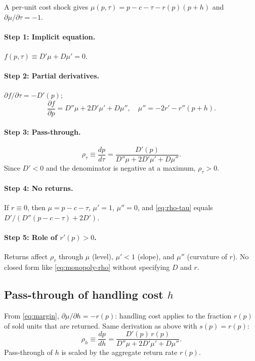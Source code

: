 \documentclass[11pt]{article}
\begin{document}
A per-unit cost shock gives $\mu(p,\tau) = p - c - \tau - r(p)(p+h)$ and
$\partial\mu/\partial\tau = -1$.

\paragraph{Step 1: Implicit equation.}
$f(p,\tau) \equiv D'\mu + D\mu' = 0$.

\paragraph{Step 2: Partial derivatives.}
$\partial f/\partial\tau = -D'(p)$;
\[
  \frac{\partial f}{\partial p}
  = D''\mu + 2D'\mu' + D\mu'',
  \quad
  \mu'' = -2r' - r''(p+h).
\]

\paragraph{Step 3: Pass-through.}
\begin{equation}
  \rho_\tau \equiv \frac{dp}{d\tau}
  = \frac{D'(p)}{D''\mu + 2D'\mu' + D\mu''}.
  \label{eq:rho-tau}
\end{equation}
Since $D'<0$ and the denominator is negative at a maximum, $\rho_\tau > 0$.

\paragraph{Step 4: No returns.}
If $r \equiv 0$, then $\mu = p-c-\tau$, $\mu'=1$, $\mu''=0$, and
\eqref{eq:rho-tau} equals $D'/(D''(p-c-\tau)+2D')$.

\paragraph{Step 5: Role of $r'(p)>0$.}
Returns affect $\rho_\tau$ through $\mu$ (level), $\mu'<1$ (slope), and
$\mu''$ (curvature of $r$).  No closed form like \eqref{eq:monopoly-rho}
without specifying $D$ and $r$.

\subsection{Pass-through of handling cost $h$}

From \eqref{eq:margin}, $\partial\mu/\partial h = -r(p)$: handling cost
applies to the fraction $r(p)$ of sold units that are returned.  Same derivation as above with $s(p)=r(p)$:
\begin{equation}
  \rho_h \equiv \frac{dp}{dh}
  = \frac{D'(p)\,r(p)}{D''\mu + 2D'\mu' + D\mu''}.
  \label{eq:rho-h}
\end{equation}
Pass-through of $h$ is scaled by the aggregate return rate $r(p)$.
\end{document}
